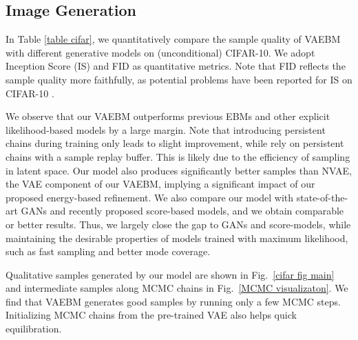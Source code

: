 \documentclass{article} \usepackage{iclr2021_conference,times}
\begin{document}
\subsection{Image Generation}\label{img generation}
In Table \ref{table cifar}, we quantitatively compare the sample quality of VAEBM with different generative models on (unconditional) CIFAR-10. We adopt Inception Score (IS) \citep{salimans2016improved} and FID \citep{heusel2017gans} as quantitative metrics. Note that FID reflects the sample quality more faithfully, as potential problems have been reported for IS on CIFAR-10 \citep{barratt2018note}.

We observe that our VAEBM outperforms previous EBMs and other explicit likelihood-based models by a large margin. Note that introducing persistent chains during training only leads to slight improvement, while \citet{du2019implicit} rely on persistent chains with a sample replay buffer. This is likely due to the efficiency of sampling in latent space. Our model also produces significantly better samples than NVAE, the VAE component of our VAEBM, implying a significant impact of our proposed energy-based refinement. We also compare our model with state-of-the-art GANs and recently proposed score-based models, and we obtain comparable or better results. Thus, we largely close the gap to GANs and score-models, while maintaining the desirable properties of models trained with maximum likelihood, such as fast sampling and better mode coverage.      

Qualitative samples generated by our model are shown in Fig.~\ref{cifar fig main} and intermediate samples along MCMC chains in Fig.~\ref{MCMC visualizaton}. We find that VAEBM generates good samples by running only a few MCMC steps. Initializing MCMC chains from the pre-trained VAE also helps quick equilibration.
\end{document}
